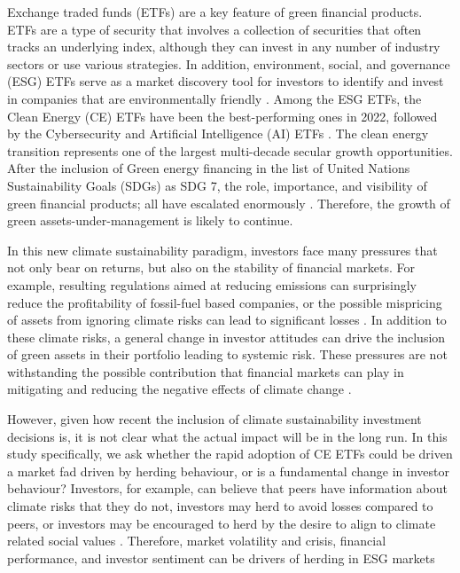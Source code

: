 \documentclass[
  letterpaper,
  DIV=11,
  numbers=noendperiod]{scrartcl}
\begin{document}
Exchange traded funds (ETFs) are a key feature of green financial
products. ETFs are a type of security that involves a collection of
securities that often tracks an underlying index, although they can
invest in any number of industry sectors or use various strategies. In
addition, environment, social, and governance (ESG) ETFs serve as a
market discovery tool for investors to identify and invest in companies
that are environmentally friendly \citep{briere2023}. Among the ESG
ETFs, the Clean Energy (CE) ETFs have been the best-performing ones in
2022, followed by the Cybersecurity and Artificial Intelligence (AI)
ETFs \citep{decclesia2024}. The clean energy transition represents one
of the largest multi-decade secular growth opportunities. After the
inclusion of Green energy financing in the list of United Nations
Sustainability Goals (SDGs) as SDG 7, the role, importance, and
visibility of green financial products; all have escalated enormously
\citep{naqvi2022}. Therefore, the growth of green
assets-under-management is likely to continue.

\newpage

In this new climate sustainability paradigm, investors face many
pressures that not only bear on returns, but also on the stability of
financial markets. For example, resulting regulations aimed at reducing
emissions can surprisingly reduce the profitability of fossil-fuel based
companies, or the possible mispricing of assets from ignoring climate
risks can lead to significant losses \citep{nguyen2025}. In addition to
these climate risks, a general change in investor attitudes can drive
the inclusion of green assets in their portfolio leading to systemic
risk. These pressures are not withstanding the possible contribution
that financial markets can play in mitigating and reducing the negative
effects of climate change \citep{giglio2021a}.

However, given how recent the inclusion of climate sustainability
investment decisions is, it is not clear what the actual impact will be
in the long run. In this study specifically, we ask whether the rapid
adoption of CE ETFs could be driven a market fad driven by herding
behaviour, or is a fundamental change in investor behaviour? Investors,
for example, can believe that peers have information about climate risks
that they do not, investors may herd to avoid losses compared to peers,
or investors may be encouraged to herd by the desire to align to climate
related social values \citep{ciciretti2021, gavrilakis2023, loang2023}.
Therefore, market volatility and crisis, financial performance, and
investor sentiment can be drivers of herding in ESG markets
\end{document}
